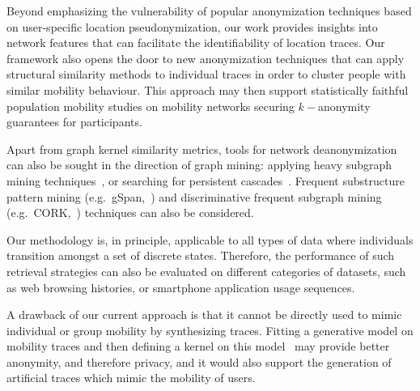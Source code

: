 Beyond emphasizing the vulnerability of popular anonymization techniques based on user-specific location pseudonymization, our work provides insights into network features that can facilitate the identifiability of location traces.
Our framework also opens the door to new anonymization techniques that can apply structural similarity methods to individual traces in order to cluster people with similar mobility behaviour.
This approach may then support statistically faithful population mobility studies on mobility networks securing $k-$anonymity guarantees for participants.

Apart from graph kernel similarity metrics, tools for network deanonymization can also be sought in the direction of graph mining: applying heavy subgraph mining techniques~\citep{Bogdanov2011}, or searching for persistent cascades~\citep{Morse16}.
Frequent substructure pattern mining (e.g.~gSpan,~) and discriminative frequent subgraph mining (e.g.~CORK,~) techniques can also be considered.

Our methodology is, in principle, applicable to all types of data where individuals transition amongst a set of discrete states.
Therefore, the performance of such retrieval strategies can also be evaluated on different categories of datasets, such as web browsing histories, or smartphone application usage sequences.

A drawback of our current approach is that it cannot be directly used to mimic individual or group mobility by synthesizing traces.
Fitting a generative model on mobility traces and then defining a kernel on this model~\citep{song11} may provide better anonymity, and therefore privacy, and it would also support the generation of artificial traces which mimic the mobility of users.
